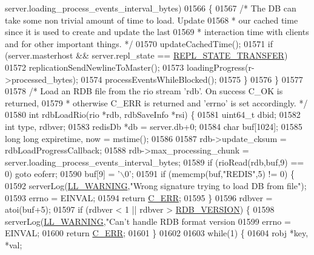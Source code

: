 \begin{DoxyCode}
{{{{{{{{{{{{{{{{{{{{{{{{{{{      server.loading\_process\_events\_interval\_bytes)
01566     \{
01567         \textcolor{comment}{/* The DB can take some non trivial amount of time to load. Update}
01568 \textcolor{comment}{         * our cached time since it is used to create and update the last}
01569 \textcolor{comment}{         * interaction time with clients and for other important things. */}
01570         updateCachedTime();
01571         \textcolor{keywordflow}{if} (server.masterhost && server.repl\_state == \hyperlink{server_8h_a1d27594a2d9c8d24e4ed5a2e88d1113e}{REPL\_STATE\_TRANSFER})
01572             replicationSendNewlineToMaster();
01573         loadingProgress(r->processed\_bytes);
01574         processEventsWhileBlocked();
01575     \}
01576 \}
01577 
01578 \textcolor{comment}{/* Load an RDB file from the rio stream 'rdb'. On success C\_OK is returned,}
01579 \textcolor{comment}{ * otherwise C\_ERR is returned and 'errno' is set accordingly. */}
01580 \textcolor{keywordtype}{int} rdbLoadRio(rio *rdb, rdbSaveInfo *rsi) \{
01581     uint64\_t dbid;
01582     \textcolor{keywordtype}{int} type, rdbver;
01583     redisDb *db = server.db+0;
01584     \textcolor{keywordtype}{char} buf[1024];
01585     \textcolor{keywordtype}{long} \textcolor{keywordtype}{long} expiretime, now = mstime();
01586 
01587     rdb->update\_cksum = rdbLoadProgressCallback;
01588     rdb->max\_processing\_chunk = server.loading\_process\_events\_interval\_bytes;
01589     \textcolor{keywordflow}{if} (rioRead(rdb,buf,9) == 0) \textcolor{keywordflow}{goto} eoferr;
01590     buf[9] = \textcolor{stringliteral}{'\(\backslash\)0'};
01591     \textcolor{keywordflow}{if} (memcmp(buf,\textcolor{stringliteral}{"REDIS"},5) != 0) \{
01592         serverLog(\hyperlink{server_8h_a31229b9334bba7d6be2a72970967a14b}{LL\_WARNING},\textcolor{stringliteral}{"Wrong signature trying to load DB from file"});
01593         errno = EINVAL;
01594         \textcolor{keywordflow}{return} \hyperlink{server_8h_af98ac28d5f4d23d7ed5985188e6fb7d1}{C\_ERR};
01595     \}
01596     rdbver = atoi(buf+5);
01597     \textcolor{keywordflow}{if} (rdbver < 1 || rdbver > \hyperlink{rdb_8h_ae34418fdbb9794fb7558a4f58bdc1cad}{RDB\_VERSION}) \{
01598         serverLog(\hyperlink{server_8h_a31229b9334bba7d6be2a72970967a14b}{LL\_WARNING},\textcolor{stringliteral}{"Can't handle RDB format version %
01599         errno = EINVAL;
01600         \textcolor{keywordflow}{return} \hyperlink{server_8h_af98ac28d5f4d23d7ed5985188e6fb7d1}{C\_ERR};
01601     \}
01602 
01603     \textcolor{keywordflow}{while}(1) \{
01604         robj *key, *val;
}}}}}}}}}}}}}}}}}}}}}}}}}}}}
\end{DoxyCode}
